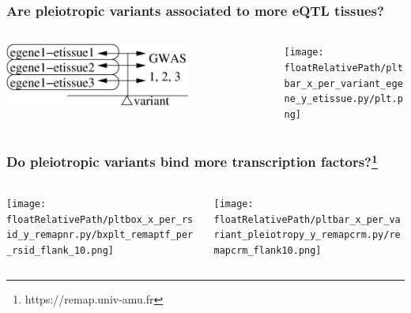\documentclass{beamer}
\newcommand*{\floatRelativePath}{../out/gwas417/pval_5e-08/r2_0.1/kb_1000/window_1000000/75_50}%
\begin{document}
    \begin{frame}
        \frametitle{Are pleiotropic variants associated to more eQTL tissues?}

        \begin{columns}
            \begin{column}{0.5\textwidth}
                \begin{center}
                    \includegraphics[width=0.7\textwidth]{../presentation_230120_gold2022_paris/fig/model_pleio_etissues.png}
                \end{center}
            \end{column}
            \begin{column}{0.5\textwidth}  %
                \begin{center}
                    \texttt{[image: \\floatRelativePath/pltbar\_x\_per\_variant\_egene\_y\_etissue.py/plt.png]}
                \end{center}
            \end{column}
        \end{columns}

    \end{frame}

    \begin{frame}
        \frametitle{Do pleiotropic variants bind more transcription factors?\footnote{https://remap.univ-amu.fr}}

        \begin{columns}
            \begin{column}{0.5\textwidth}
                \begin{center}
                    \texttt{[image: \\floatRelativePath/pltbox\_x\_per\_rsid\_y\_remapnr.py/bxplt\_remaptf\_per\_rsid\_flank\_10.png]}
                \end{center}
            \end{column}
            \begin{column}{0.5\textwidth}  %
                \begin{center}
                    \texttt{[image: \\floatRelativePath/pltbar\_x\_per\_variant\_pleiotropy\_y\_remapcrm.py/remapcrm\_flank10.png]}
                \end{center}
            \end{column}
        \end{columns}


    \end{frame}
\end{document}
